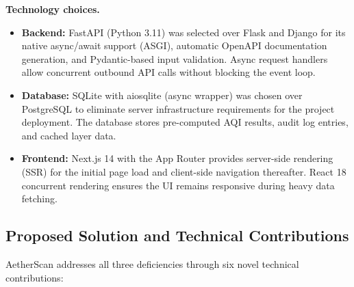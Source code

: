 \documentclass[12pt,a4paper]{article}
\begin{document}
\noindent\textbf{Technology choices.}
\begin{itemize}[leftmargin=*]
\item \textbf{Backend:} FastAPI (Python 3.11) was selected over Flask and Django
      for its native async/await support (ASGI), automatic OpenAPI documentation
      generation, and Pydantic-based input validation. Async request handlers
      allow concurrent outbound API calls without blocking the event loop.
\item \textbf{Database:} SQLite with aiosqlite (async wrapper) was chosen over
      PostgreSQL to eliminate server infrastructure requirements for the
      project deployment. The database stores pre-computed AQI results, audit
      log entries, and cached layer data.
\item \textbf{Frontend:} Next.js 14 with the App Router provides server-side
      rendering (SSR) for the initial page load and client-side navigation
      thereafter. React 18 concurrent rendering ensures the UI remains
      responsive during heavy data fetching.
\end{itemize}



\subsection{Proposed Solution and Technical Contributions}
\label{sec:intro:solution}

AetherScan addresses all three deficiencies through six novel technical
contributions:
\end{document}
